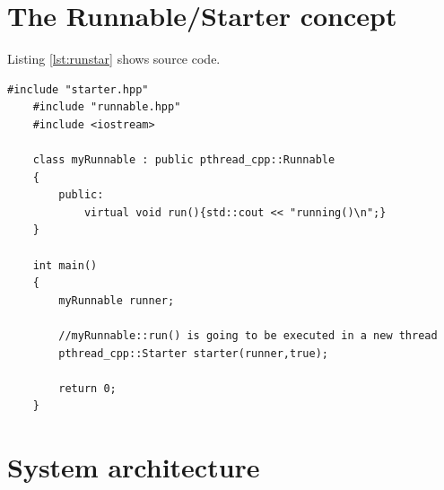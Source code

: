 \documentclass[10pt,a4paper,DIV=11]{scrreprt}
\begin{document}
\section{The Runnable/Starter concept}

Listing \ref{lst:runstar} shows source code. 

    \begin{lstlisting}[morekeywords={class},caption={Implementation of the Runnable/Starter concept},label={lst:runstar},stepnumber=1]
    #include "starter.hpp"
    #include "runnable.hpp"
    #include <iostream>

    class myRunnable : public pthread_cpp::Runnable
    {
        public:
            virtual void run(){std::cout << "running()\n";}
    }

    int main()
    {
        myRunnable runner;
        
        //myRunnable::run() is going to be executed in a new thread
        pthread_cpp::Starter starter(runner,true);
        
        return 0;
    }
    \end{lstlisting}

\section{System architecture}
\end{document}

